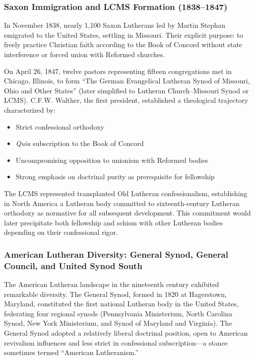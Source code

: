 \subsubsection{Saxon Immigration and LCMS Formation (1838--1847)}

In November 1838, nearly 1,100 Saxon Lutherans led by Martin Stephan emigrated to the United States, settling in Missouri. Their explicit purpose: to freely practice Christian faith according to the Book of Concord without state interference or forced union with Reformed churches.

On April 26, 1847, twelve pastors representing fifteen congregations met in Chicago, Illinois, to form ``The German Evangelical Lutheran Synod of Missouri, Ohio and Other States'' (later simplified to Lutheran Church--Missouri Synod or LCMS). C.F.W. Walther, the first president, established a theological trajectory characterized by:

\begin{itemize}
\item Strict confessional orthodoxy
\item \textit{Quia} subscription to the Book of Concord
\item Uncompromising opposition to unionism with Reformed bodies
\item Strong emphasis on doctrinal purity as prerequisite for fellowship
\end{itemize}

The LCMS represented transplanted Old Lutheran confessionalism, establishing in North America a Lutheran body committed to sixteenth-century Lutheran orthodoxy as normative for all subsequent development. This commitment would later precipitate both fellowship and schism with other Lutheran bodies depending on their confessional rigor.

\subsubsection{American Lutheran Diversity: General Synod, General Council, and United Synod South}

The American Lutheran landscape in the nineteenth century exhibited remarkable diversity. The General Synod, formed in 1820 at Hagerstown, Maryland, constituted the first national Lutheran body in the United States, federating four regional synods (Pennsylvania Ministerium, North Carolina Synod, New York Ministerium, and Synod of Maryland and Virginia). The General Synod adopted a relatively liberal doctrinal position, open to American revivalism influences and less strict in confessional subscription---a stance sometimes termed ``American Lutheranism.''

